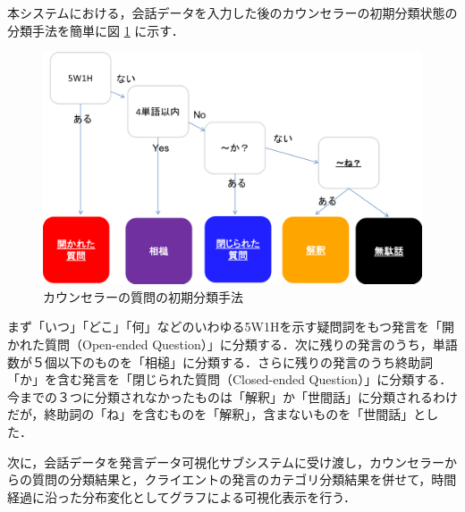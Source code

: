 \documentclass[shuuron]{kuee}
\begin{document}
本システムにおける，会話データを入力した後のカウンセラーの初期分類状態の分類手法を簡単に図
\ref{fig:5_2}
に示す．
\begin{figure}
  \begin{center}
    \includegraphics[width=\linewidth]{5_2.png}
  \end{center}
  \caption{カウンセラーの質問の初期分類手法}
  \label{fig:5_2}
\end{figure}
まず「いつ」「どこ」「何」などのいわゆる5W1Hを示す疑問詞をもつ発言を「開かれた質問（Open-ended Question）」に分類する．次に残りの発言のうち，単語数が５個以下のものを「相槌」に分類する．さらに残りの発言のうち終助詞「か」を含む発言を「閉じられた質問（Closed-ended Question）」に分類する．今までの３つに分類されなかったものは「解釈」か「世間話」に分類されるわけだが，終助詞の「ね」を含むものを「解釈」，含まないものを「世間話」とした．



次に，会話データを発言データ可視化サブシステムに受け渡し，カウンセラーからの質問の分類結果と，クライエントの発言のカテゴリ分類結果を併せて，時間経過に沿った分布変化としてグラフによる可視化表示を行う．










\end{document}

